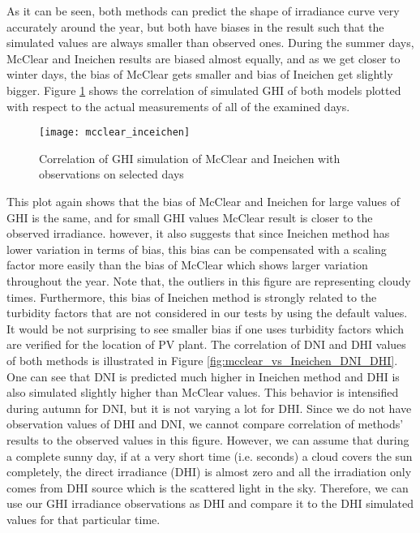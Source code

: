As it can be seen, both methods can predict the shape of irradiance curve very accurately around the year, but both have biases in the result such that the simulated values are always smaller than observed ones. During the summer days, McClear and Ineichen results are biased almost equally, and as we get closer to winter days, the bias of McClear gets smaller and bias of Ineichen get slightly bigger. 
Figure \ref{fig:mcclear_to_Ineichen} shows the correlation of simulated GHI of both models plotted with respect to the actual measurements of all of the examined days.

\begin{figure}[h!]
\caption{Correlation of GHI simulation of McClear and Ineichen with observations on selected days}
\label{fig:mcclear_to_Ineichen}
\texttt{[image: mcclear\_inceichen]}
\centering
\end{figure}

This plot again shows that the bias of McClear and Ineichen for large values of GHI is the same, and for small GHI values McClear result is closer to the observed irradiance. however, it also suggests that since Ineichen method has lower variation in terms of bias, this bias can be compensated with a scaling factor more easily than the bias of McClear which shows larger variation throughout the year. Note that, the outliers in this figure are representing cloudy times. Furthermore, this bias of Ineichen method is strongly related to the turbidity factors that are not considered in our tests by using the default values. It would be not surprising to see smaller bias if one uses turbidity factors which are verified for the location of PV plant. The correlation of DNI and DHI values of both methods is illustrated in Figure \ref{fig:mcclear_vs_Ineichen_DNI_DHI}. One can see that DNI is predicted much higher in Ineichen method and DHI is also simulated slightly higher than McClear values. This behavior is intensified during autumn for DNI, but it is not varying a lot for DHI. Since we do not have observation values of DHI and DNI, we cannot compare correlation of methods' results to the observed values in this figure. However, we can assume that during a complete sunny day, if at a very short time (i.e. seconds) a cloud covers the sun completely, the direct irradiance (DHI) is almost zero and all the irradiation only comes from DHI source which is the scattered light in the sky. Therefore, we can use our GHI irradiance observations as DHI and compare it to the DHI simulated values for that particular time. 


